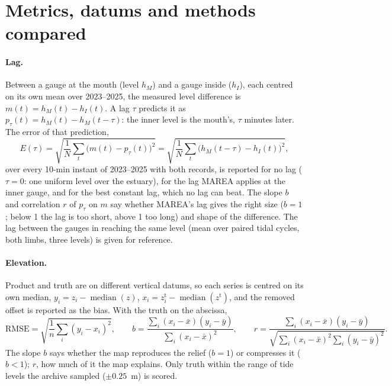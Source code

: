 \documentclass[11pt,a4paper]{article}
\begin{document}
\section{Metrics, datums and methods compared}

\paragraph{Lag.} Between a gauge at the mouth (level $h_M$) and a gauge
inside ($h_I$), each centred on its own mean over 2023--2025, the
measured level difference is $m(t) = h_M(t) - h_I(t)$. A lag $\tau$
predicts it as $p_\tau(t) = h_M(t) - h_M(t-\tau)$: the inner level is the
mouth's, $\tau$ minutes later. The error of that prediction,
\begin{equation}
E(\tau) = \sqrt{\frac{1}{N}\sum_{t}\big(m(t) - p_\tau(t)\big)^2}
        = \sqrt{\frac{1}{N}\sum_{t}\big(h_M(t-\tau) - h_I(t)\big)^2},
\label{eq:lag}
\end{equation}
over every 10-min instant of 2023--2025 with both records, is reported for
no lag ($\tau = 0$: one uniform level over the estuary), for the lag MAREA
applies at the inner gauge, and for the best constant lag, which no lag
can beat. The slope $b$ and correlation $r$ of $p_\tau$ on $m$ say
whether MAREA's lag gives the right size ($b = 1$; below 1 the lag is too
short, above 1 too long) and shape of the difference. The lag between the
gauges in reaching the same level (mean over paired tidal cycles, both
limbs, three levels) is given for reference.

\paragraph{Elevation.} Product and truth are on different vertical datums,
so each series is centred on its own median, $y_i = z_i -
\operatorname{median}(z)$, $x_i = z^{\mathrm{t}}_i -
\operatorname{median}(z^{\mathrm{t}})$, and the removed offset is reported
as the bias. With the truth on the abscissa,
\begin{equation}
\mathrm{RMSE} = \sqrt{\frac{1}{n}\sum_{i}(y_i - x_i)^2},\qquad
b = \frac{\sum_i (x_i-\bar x)(y_i-\bar y)}{\sum_i (x_i-\bar x)^2},\qquad
r = \frac{\sum_i (x_i-\bar x)(y_i-\bar y)}{\sqrt{\sum_i (x_i-\bar x)^2\sum_i (y_i-\bar y)^2}}.
\label{eq:elev}
\end{equation}
The slope $b$ says whether the map reproduces the relief ($b = 1$) or
compresses it ($b < 1$); $r$, how much of it the map explains. Only truth
within the range of tide levels the archive sampled ($\pm 0.25$~m) is
scored.
\end{document}
